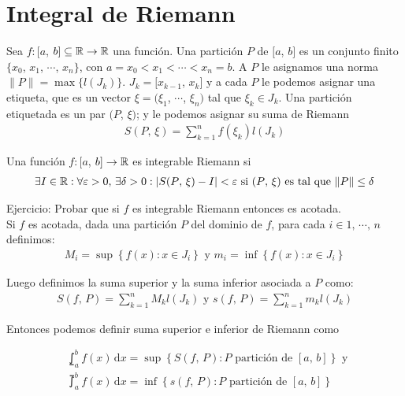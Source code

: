 \section{Integral de Riemann}

Sea $f: [a$, $b] \subseteq \mathbb{R} \to \mathbb{R}$ una función.
Una partición $P$ de $[a$, $b]$ es un conjunto finito \\ $\{ x_0$, $x_1$, $\cdots$, $x_n \}$, con
$a = x_0 < x_1 < \cdots < x_n = b$. A $P$ le asignamos una norma $\| P \| = \max \{ l(J_k) \}$. $J_k = [x_{k-1}$, $x_k]$ y a cada $P$ le
podemos asignar una etiqueta, que es un vector $\xi = (\xi_1$, $\cdots$, $\xi_n)$ tal que $\xi_k \in J_k$. Una partición etiquetada es un par
$(P$, $\xi)$; y le podemos asignar su suma de Riemann \begin{align*}S(P\text{, } \xi) = \sum_{k=1}^{n} f(\xi_k) l(J_k)\end{align*}

\begin{definition}
    Una función $f: [a$, $b] \to \mathbb{R}$ es integrable Riemann si
    \begin{align*}
        \exists I \in \mathbb{R} : \forall \varepsilon > 0\text{, }\exists \delta > 0 : | S(P\text{, } \xi) - I | < \varepsilon \text{ si } (P\text{, } \xi) \text{ es tal que } \| P \| \leq \delta
    \end{align*}
\end{definition}

Ejercicio: Probar que si $f$ es integrable Riemann entonces es acotada. \\

Si $f$ es acotada, dada una partición $P$ del dominio de $f$, para cada $i \in 1 \text{, } \cdots \text{, } n$ definimos:
\begin{align*}
    M_i = \sup \left\{ f(x) : x \in J_i \right\} \text{ y } m_i = \inf\left\{ f(x) : x \in J_i \right\}
\end{align*}

Luego definimos la suma superior y la suma inferior asociada a $P$ como:
\begin{align*}
    S(f\text{, } P) = \sum_{k=1}^{n} M_k l(J_k) \text{ y } s(f\text{, } P) = \sum_{k=1}^{n} m_k l(J_k)
\end{align*}

Entonces podemos definir suma superior e inferior de Riemann como

\begin{align*}
     & \lowint_a^b f(x) \, \mathrm{d}x = \sup \left\{ S(f\text{, } P) : P \text{ partición de } [a\text{, } b] \right\} \text{ y } \\
     & \upint_a^b f(x) \, \mathrm{d}x = \inf \left\{ s(f\text{, } P) : P \text{ partición de } [a\text{, } b] \right\}
\end{align*}


